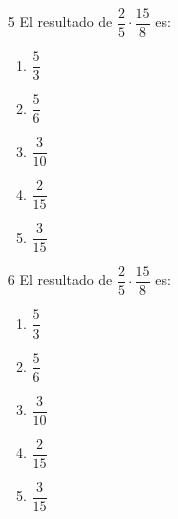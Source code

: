 \documentclass[12pt]{article}
\begin{document}
\begin{multicols}{2}
   \begin{enumerate}
   	\item [5]El resultado de $\dfrac{2}{5} \cdot \dfrac{15}{8}$	es:
   	\begin{enumerate}
   		\item $\dfrac{5}{3}$\\
   		\item $\dfrac{5}{6}$\\
   		\item $\dfrac{3}{10}$\\
   		\item $\dfrac{2}{15}$\\
   		\item $\dfrac{3}{15}$\\
   	\end{enumerate}
   \end{enumerate}
   \begin{enumerate}
   	\item [6]El resultado de $\dfrac{2}{5} \cdot \dfrac{15}{8}$	es:
   	\begin{enumerate}
   		\item $\dfrac{5}{3}$\\
   		\item $\dfrac{5}{6}$\\
   		\item $\dfrac{3}{10}$\\
   		\item $\dfrac{2}{15}$\\
   		\item $\dfrac{3}{15}$\\
   	\end{enumerate}
   \end{enumerate} 
\end{multicols}
\end{document}

